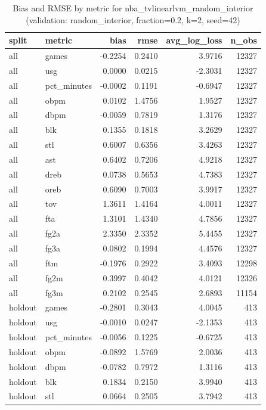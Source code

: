 \begin{table}
\caption{Bias and RMSE by metric for nba_tvlinearlvm_random_interior (validation: random_interior, fraction=0.2, k=2, seed=42)}
\label{tab:nba_tvlinearlvm_random_interior_vs_random_interior_f20_k2_s42_bias_rmse}
\begin{tabular}{llrrrr}
\toprule
split & metric & bias & rmse & avg\_log\_loss & n\_obs \\
\midrule
all & games & -0.2254 & 0.2410 & 3.9716 & 12327 \\
all & usg & 0.0000 & 0.0215 & -2.3031 & 12327 \\
all & pct\_minutes & -0.0002 & 0.1191 & -0.6947 & 12327 \\
all & obpm & 0.0102 & 1.4756 & 1.9527 & 12327 \\
all & dbpm & -0.0059 & 0.7819 & 1.3176 & 12327 \\
all & blk & 0.1355 & 0.1818 & 3.2629 & 12327 \\
all & stl & 0.6007 & 0.6356 & 3.4263 & 12327 \\
all & ast & 0.6402 & 0.7206 & 4.9218 & 12327 \\
all & dreb & 0.0738 & 0.5653 & 4.7383 & 12327 \\
all & oreb & 0.6090 & 0.7003 & 3.9917 & 12327 \\
all & tov & 1.3611 & 1.4164 & 4.0011 & 12327 \\
all & fta & 1.3101 & 1.4340 & 4.7856 & 12327 \\
all & fg2a & 2.3350 & 2.3352 & 5.4455 & 12327 \\
all & fg3a & 0.0802 & 0.1994 & 4.4576 & 12327 \\
all & ftm & -0.1976 & 0.2922 & 3.4093 & 12298 \\
all & fg2m & 0.3997 & 0.4042 & 4.0121 & 12326 \\
all & fg3m & 0.2102 & 0.2545 & 2.6893 & 11154 \\
holdout & games & -0.2801 & 0.3043 & 4.0045 & 413 \\
holdout & usg & -0.0010 & 0.0247 & -2.1353 & 413 \\
holdout & pct\_minutes & -0.0056 & 0.1225 & -0.6725 & 413 \\
holdout & obpm & -0.0892 & 1.5769 & 2.0036 & 413 \\
holdout & dbpm & -0.0782 & 0.7972 & 1.3116 & 413 \\
holdout & blk & 0.1834 & 0.2150 & 3.9940 & 413 \\
holdout & stl & 0.0664 & 0.2505 & 3.7942 & 413 \\

\end{tabular}
\end{table}
